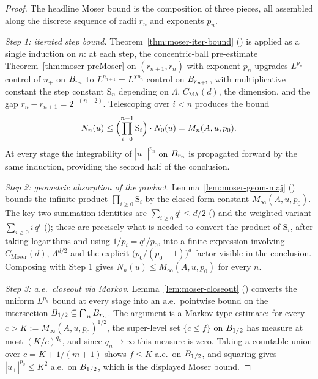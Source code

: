 \begin{proof}
\leanok
{}

The headline Moser bound is the composition of three pieces, all assembled
along the discrete sequence of radii $r_n$ and exponents $p_n$.

\emph{Step 1: iterated step bound.} Theorem~\ref{thm:moser-iter-bound}
() is applied as a single induction on
$n$: at each step, the concentric-ball pre-estimate
Theorem~\ref{thm:moser-preMoser} on $(r_{n+1}, r_n)$ with exponent $p_n$
upgrades $L^{p_n}$ control of $u_+$ on $B_{r_n}$ to $L^{p_{n+1}} = L^{\chi p_n}$
control on $B_{r_{n+1}}$, with multiplicative constant the step constant
$\mathrm{S}_n$ depending on $\Lambda$, $C_{\mathrm{MA}}(d)$, the dimension,
and the gap $r_n - r_{n+1} = 2^{-(n+2)}$. Telescoping over $i < n$ produces
the bound
\begin{equation*}
  N_n(u)
   \le \Bigl(\prod_{i=0}^{n-1} \mathrm{S}_i\Bigr) \cdot N_0(u)
   = M_n(A, u, p_0).
\end{equation*}
At every stage the integrability of $|u_+|^{p_n}$ on $B_{r_n}$ is propagated
forward by the same induction, providing the second half of the conclusion.

\emph{Step 2: geometric absorption of the product.}
Lemma~\ref{lem:moser-geom-maj} ()
bounds the infinite product $\prod_{i \ge 0} \mathrm{S}_i$ by the closed-form
constant $M_\infty(A,u,p_0)$. The key two summation identities are
$\sum_{i \ge 0} q^{i} \le d/2$
() and the weighted variant
$\sum_{i \ge 0} i\,q^{i}$
(); these are precisely
what is needed to convert the product of $\mathrm{S}_i$, after taking
logarithms and using $1/p_i = q^{i}/p_0$, into a finite expression involving
$C_{\mathrm{Moser}}(d)$, $\Lambda^{d/2}$ and the explicit
$\bigl(p_0/(p_0-1)\bigr)^{d}$ factor visible in the conclusion. Composing with
Step 1 gives $N_n(u) \le M_\infty(A, u, p_0)$ for every $n$.

\emph{Step 3: a.e.\ closeout via Markov.}
Lemma~\ref{lem:moser-closeout} () converts the
uniform $L^{p_n}$ bound at every stage into an a.e.\ pointwise bound on the
intersection $B_{1/2} \subseteq \bigcap_n B_{r_n}$. The argument is a
Markov-type estimate: for every $c > K := M_\infty(A,u,p_0)^{1/2}$, the
super-level set $\{c \le f\}$ on $B_{1/2}$ has measure at most
$(K/c)^{q_n}$, and since $q_n \to \infty$ this measure is zero. Taking a
countable union over $c = K + 1/(m+1)$ shows $f \le K$ a.e.\ on $B_{1/2}$,
and squaring gives $|u_+|^{p_0} \le K^{2}$ a.e.\ on $B_{1/2}$, which is the
displayed Moser bound.
\end{proof}

